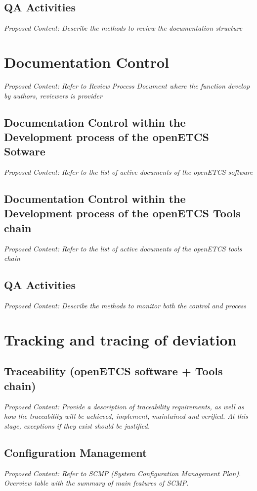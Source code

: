 \documentclass{template/openetcs_article}
\begin{document}
\subsection{QA Activities}
\textit{Proposed Content: Describe the methods to review the documentation structure}

\section{Documentation Control}
\textit{Proposed Content: Refer to Review Process Document where the function develop by authors, reviewers is provider}

\subsection{Documentation Control within the Development process of the openETCS Sotware}
\textit{Proposed Content: Refer to the list of active documents of the openETCS software}

\subsection{Documentation Control within the Development process of the openETCS Tools chain}
\textit{Proposed Content: Refer to the list of active documents of the openETCS tools chain}

\subsection{QA Activities}
\textit{Proposed Content: Describe the methods to monitor both the control and process}

\section{Tracking and tracing of deviation}


\subsection{Traceability (openETCS software + Tools chain)}
\textit{Proposed Content: Provide a description of traceability requirements, as well as how the traceability will be achieved, implement, maintained and verified. At this stage, exceptions if they exist should be justified.}

\subsection{Configuration Management}
\textit{Proposed Content: Refer to SCMP (System Configuration Management Plan). Overview table with the summary of main features of SCMP.}
\end{document}
